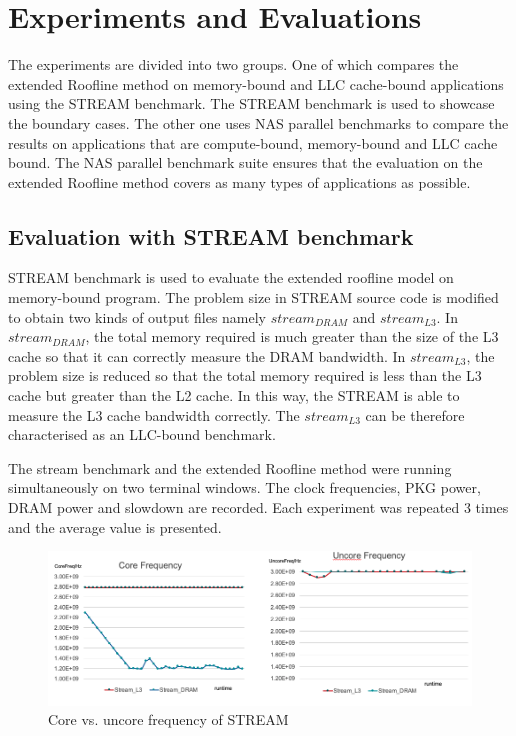 \chapter{Experiments and Evaluations}

The experiments are divided into two groups. One of which compares the extended Roofline method on memory-bound and LLC cache-bound applications using the STREAM benchmark. The STREAM benchmark is used to showcase the boundary cases. The other one uses NAS parallel benchmarks \cite{23} to compare the results on applications that are compute-bound, memory-bound and LLC cache bound. The NAS parallel benchmark suite ensures that the evaluation on the extended Roofline method covers as many types of applications as possible. 

\section{Evaluation with STREAM benchmark}
STREAM benchmark is used to evaluate the extended roofline model on memory-bound program. The problem size in STREAM source code is modified to obtain two kinds of output files namely $stream_{DRAM}$ and $stream_{L3}$. In $stream_{DRAM}$, the total memory required is much greater than the size of the L3 cache so that it can correctly measure the DRAM bandwidth. In $stream_{L3}$, the problem size is reduced so that the total memory required is less than the L3 cache but greater than the L2 cache. In this way, the STREAM is able to measure the L3 cache bandwidth correctly. The $stream_{L3}$ can be therefore characterised as an LLC-bound benchmark.

The stream benchmark and the extended Roofline method were running simultaneously on two terminal windows. The clock frequencies, PKG power, DRAM power and slowdown are recorded. Each experiment was repeated 3 times and the average value is presented. 

\begin{figure} [h] %
	\centering   %
	\includegraphics[width=17cm]{pictures/cuc}
	\caption{Core vs. uncore frequency of STREAM}
\end{figure}

